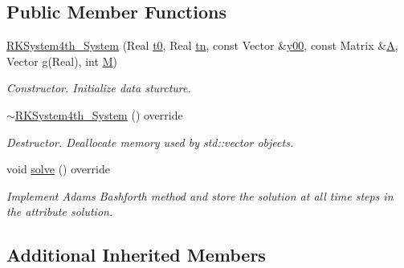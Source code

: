 \subsection*{Public Member Functions}
\begin{DoxyCompactItemize}
\item 
\mbox{\label{class_r_k_system4th___system_a1c7317e4d0987ad09f2e58f931d8e5f0}} 
\mbox{\hyperlink{class_r_k_system4th___system_a1c7317e4d0987ad09f2e58f931d8e5f0}{R\+K\+System4th\+\_\+\+System}} (Real \mbox{\hyperlink{class_o_d_e___system_a1947b357608babc98c5e79d645e24c3c}{t0}}, Real \mbox{\hyperlink{class_o_d_e___system_a5c5a0dd9f04dfb8d8a84d49b741773af}{tn}}, const Vector \&\mbox{\hyperlink{class_o_d_e___system_a1379137a4480e5861fd1911bc061f908}{y00}}, const Matrix \&\mbox{\hyperlink{class_o_d_e___system_a632009677e80b62a1996e842398bf8b6}{A}}, Vector \mbox{\hyperlink{class_o_d_e___system_a5a294fda765e6cbfd7dfda43755d2c55}{g}}(Real), int \mbox{\hyperlink{class_o_d_e___system_a46e5ee402ffc7c500dccad753a1fba36}{M}})
\begin{DoxyCompactList}\small\item\em Constructor. Initialize data sturcture. \end{DoxyCompactList}\item 
\mbox{\label{class_r_k_system4th___system_aae823a4345fcf79cde38b100e473346f}} 
\mbox{\hyperlink{class_r_k_system4th___system_aae823a4345fcf79cde38b100e473346f}{$\sim$\+R\+K\+System4th\+\_\+\+System}} () override
\begin{DoxyCompactList}\small\item\em Destructor. Deallocate memory used by std\+::vector objects. \end{DoxyCompactList}\item 
void \mbox{\hyperlink{class_r_k_system4th___system_ae7e9125546c6590f50d581f5e6668c82}{solve}} () override
\begin{DoxyCompactList}\small\item\em Implement Adams Bashforth method and store the solution at all time steps in the attribute solution. \end{DoxyCompactList}\end{DoxyCompactItemize}
\subsection*{Additional Inherited Members}


